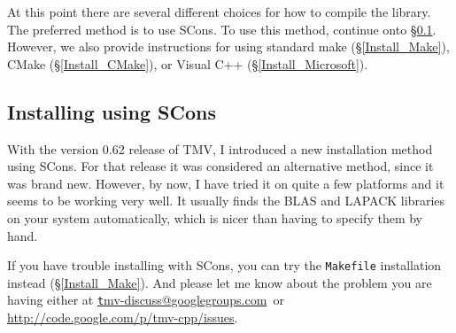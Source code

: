 \documentclass[twoside,letterpaper,11pt]{article}
\makeatletter
\newcommand{\mygroupx}{tmv-discuss@googlegroups.com}
\newcommand{\mygroup}{\href{mailto:\mygroupx}{\texttt \mygroupx}}
\newcommand{\myissuesx}{http://code.google.com/p/tmv-cpp/issues}
\newcommand{\myissues}{\url{\myissuesx}}
\makeatother
\begin{document}
At this point there are several different choices for how to compile the library.
The preferred method is to use SCons.  To use this method, continue onto \S\ref{Install_SCons}.
However, we also provide instructions for using standard make (\S\ref{Install_Make}),
CMake (\S\ref{Install_CMake}), or Visual C++ (\S\ref{Install_Microsoft}).



\subsection{Installing using SCons}
\label{Install_SCons}

With the version 0.62 release of TMV, I introduced a new installation method using SCons.  
For that 
release it was considered an alternative method, since it was brand new.  However, by now, I
have tried it on quite a few platforms and it seems to be working very well.  It usually finds
the BLAS and LAPACK libraries on your system automatically, which is nicer than having 
to specify them by hand.

If you have trouble installing with SCons, you can try the 
\texttt{Makefile} installation instead (\S\ref{Install_Make}).  And please let me know about 
the problem you are having either at \mygroup\ or \myissues.
\end{document}
